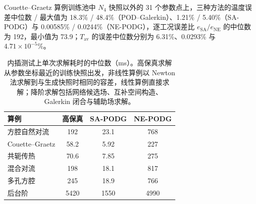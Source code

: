 Couette--Graetz 算例训练池中 $N_4$ 快照以外的 31 个参数点上，三种方法的温度误差中位数 / 最大值为 18.3\% / 48.4\%（POD--Galerkin）、1.21\% / 5.40\%（SA-PODG）与 0.00585\% / 0.0244\%（NE-PODG），逐工况误差比 $e_{\mathrm{SA}}/e_{\mathrm{NE}}$ 的中位数为 192，最小值为 73.9；$T_{\mathrm{av}}$ 的误差中位数分别为 6.31\%、0.0293\% 与 $4.71\times10^{-5}\%$。

\begin{table}[H]
\centering
\caption{内插测试上单次求解耗时的中位数（ms）。高保真求解从参数坐标最近的训练快照出发，非线性算例以 Newton 法求解到与生成快照时相同的容差，线性算例直接求解；降阶求解包括网络候选场、互补空间构造、Galerkin 闭合与辅助场求解。}
\label{tab:timing}
\small
\begin{tabular}{lccc}
\toprule
算例 & 高保真 & SA-PODG & NE-PODG \\
\midrule
方腔自然对流 & 192 & 23.1 & 768 \\
Couette--Graetz & 58.2 & 5.92 & 227 \\
共轭传热 & 70.6 & 7.85 & 275 \\
混合对流 & 198 & 18.1 & 817 \\
多孔方腔 & 245 & 18.9 & 766 \\
后台阶 & 5420 & 1550 & 4990 \\
\bottomrule
\end{tabular}
\end{table}
